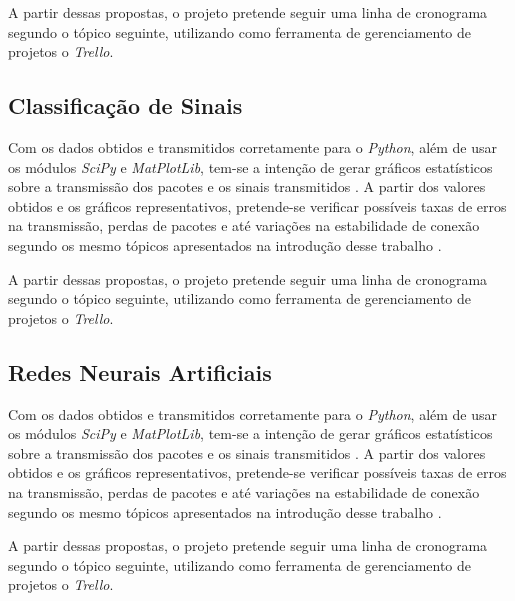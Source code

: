 \documentclass[conference]{IEEEtran}
\begin{document}
A partir dessas propostas, o projeto pretende seguir uma linha de cronograma segundo o t\'opico seguinte, utilizando como ferramenta de gerenciamento de projetos o \textit{Trello}.

\subsection{Classificação de Sinais}
Com os dados obtidos e transmitidos corretamente para o \textit{Python}, al\'em de usar os m\'odulos \textit{SciPy} e \textit{MatPlotLib}, tem-se a inten\c{c}\~ao de gerar gr\'aficos estat\'isticos sobre a transmiss\~ao dos pacotes e os sinais transmitidos \cite{pythonPSV}. A partir dos valores obtidos e os gr\'aficos representativos, pretende-se verificar poss\'iveis taxas de erros na transmiss\~ao, perdas de pacotes e at\'e varia\c{c}\~oes na estabilidade de conex\~ao segundo os mesmo t\'opicos apresentados na introdu\c{c}\~ao desse trabalho \cite{ciscoRfProblems}.

A partir dessas propostas, o projeto pretende seguir uma linha de cronograma segundo o t\'opico seguinte, utilizando como ferramenta de gerenciamento de projetos o \textit{Trello}.

\subsection{Redes Neurais Artificiais}
Com os dados obtidos e transmitidos corretamente para o \textit{Python}, al\'em de usar os m\'odulos \textit{SciPy} e \textit{MatPlotLib}, tem-se a inten\c{c}\~ao de gerar gr\'aficos estat\'isticos sobre a transmiss\~ao dos pacotes e os sinais transmitidos \cite{pythonPSV}. A partir dos valores obtidos e os gr\'aficos representativos, pretende-se verificar poss\'iveis taxas de erros na transmiss\~ao, perdas de pacotes e at\'e varia\c{c}\~oes na estabilidade de conex\~ao segundo os mesmo t\'opicos apresentados na introdu\c{c}\~ao desse trabalho \cite{ciscoRfProblems}.

A partir dessas propostas, o projeto pretende seguir uma linha de cronograma segundo o t\'opico seguinte, utilizando como ferramenta de gerenciamento de projetos o \textit{Trello}.
\end{document}
